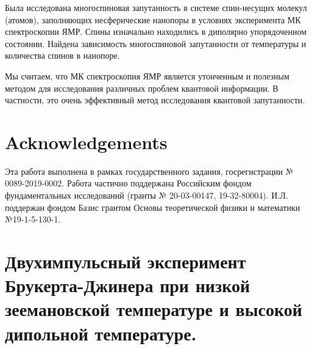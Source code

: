 \documentclass[utf8]{jetp}
\begin{document}
Была исследована многоспиновая запутанность в системе спин-несущих молекул (атомов), заполняющих несферические нанопоры в условиях эксперимента МК спектроскопии ЯМР.
Спины изначально находились в диполярно упорядоченном состоянии.
Найдена зависимость многоспиновой запутанности от температуры и количества спинов в нанопоре.

Мы считаем, что МК спектроскопия ЯМР является утонченным и полезным методом для исследования различных проблем квантовой информации.
В частности, это очень эффективный метод исследования квантовой запутанности.


\section{Acknowledgements}
Эта работа выполнена в рамках государственного задания, госрегистрации № 0089-2019-0002. 
Работа частично поддержана Российским фондом фундаментальных исследований (гранты № 20-03-00147, 19-32-80004).
И.Л. поддержан фондом Базис грантом Основы теоретической физики и математики №19-1-5-130-1.



\appendix
\section{Двухимпульсный эксперимент Брукерта-Джинера при низкой зеемановской температуре и высокой дипольной температуре.}
\end{document}
